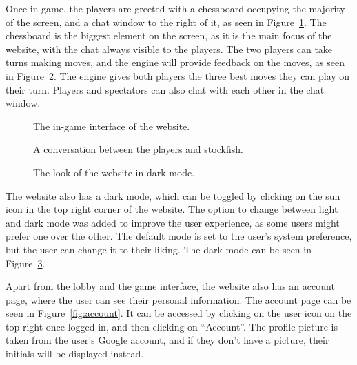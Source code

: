 Once in-game, the players are greeted with a chessboard occupying the majority of the screen, and a chat window to the
right of it, as seen in Figure~\ref{fig:game}.
The chessboard is the biggest element on the screen, as it is the main focus of the website, with the chat always
visible to the players.
The two players can take turns making moves, and the engine will provide feedback on the moves, as seen in
Figure~\ref{fig:game-chat}.
The engine gives both players the three best moves they can play on their turn.
Players and spectators can also chat with each other in the chat window.

\begin{figure}[H]
    \centering
    \setlength{\fboxsep}{0pt}
    \caption{The in-game interface of the website.}\label{fig:game}
\end{figure}

\begin{figure}[H]
    \centering
    \setlength{\fboxsep}{0pt}
    \caption{A conversation between the players and stockfish.}\label{fig:game-chat}
\end{figure}

\begin{figure}[H]
    \centering
    \setlength{\fboxsep}{0pt}
    \caption{The look of the website in dark mode.}\label{fig:game-dark}
\end{figure}

The website also has a dark mode, which can be toggled by clicking on the sun icon in the top right corner of the
website.
The option to change between light and dark mode was added to improve the user experience, as some users might prefer
one over the other.
The default mode is set to the user's system preference, but the user can change it to their liking.
The dark mode can be seen in Figure~\ref{fig:game-dark}.

Apart from the lobby and the game interface, the website also has an account page, where the user can see their
personal information.
The account page can be seen in Figure~\ref{fig:account}.
It can be accessed by clicking on the user icon on the top right once logged in, and then clicking on ``Account''.
The profile picture is taken from the user's Google account, and if they don't have a picture, their initials will be
displayed instead.

